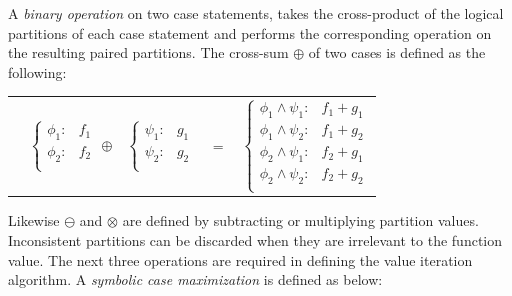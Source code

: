\documentclass{article} %
\begin{document}
A \emph{binary operation} on two case statements, takes the cross-product of the logical partitions of each case statement and performs the corresponding operation on the resulting paired partitions.  The cross-sum $\oplus$ of two cases is defined as the following:
{\footnotesize 
\begin{center}
\begin{tabular}{r c c c l}
&
\hspace{-6mm} 
  $\begin{cases}
    \phi_1: & f_1 \\ 
    \phi_2: & f_2 \\ 
  \end{cases}$
$\oplus$
&
\hspace{-4mm}
  $\begin{cases}
    \psi_1: & g_1 \\ 
    \psi_2: & g_2 \\ 
  \end{cases}$
&
\hspace{-2mm} 
$ = $
&
\hspace{-2mm}
  $\begin{cases}
  \phi_1 \wedge \psi_1: & f_1 + g_1 \\ 
  \phi_1 \wedge \psi_2: & f_1 + g_2 \\ 
  \phi_2 \wedge \psi_1: & f_2 + g_1 \\ 
  \phi_2 \wedge \psi_2: & f_2 + g_2 \\ 
  \end{cases}$
\end{tabular}
\end{center}
}
\normalsize
Likewise $\ominus$ and $\otimes$ are defined by subtracting or multiplying partition values.  Inconsistent partitions can be discarded when they are irrelevant to the function value.
The next three operations are required in defining the value iteration algorithm. A \emph{symbolic case maximization} is defined as below:
\vspace{-4mm}
\end{document}
